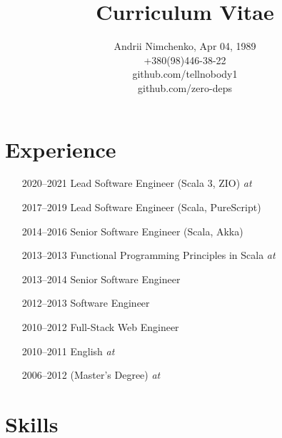 


\title{Curriculum Vitae}
\author{
  Andrii Nimchenko, Apr 04, 1989\\
  +380(98)446-38-22\\
  github.com/tellnobody1\\
  github.com/zero-deps
}
\date{}
\maketitle

\section{Experience}
\begin{itemize}
  \item[2020–2021] Lead Software Engineer (Scala 3, ZIO) \textit{at }
  \item[2017–2019] Lead Software Engineer (Scala, PureScript)
  \item[2014–2016] Senior Software Engineer (Scala, Akka)
  \item[2013–2013] Functional Programming Principles in Scala \textit{at }
  \item[2013–2014] Senior Software Engineer
  \item[2012–2013] Software Engineer
  \item[2010–2012] Full-Stack Web Engineer
  \item[2010–2011] English  \textit{at }
  \item[2006–2012]  (Master's Degree) \textit{at }
\end{itemize}

\section{Skills}


